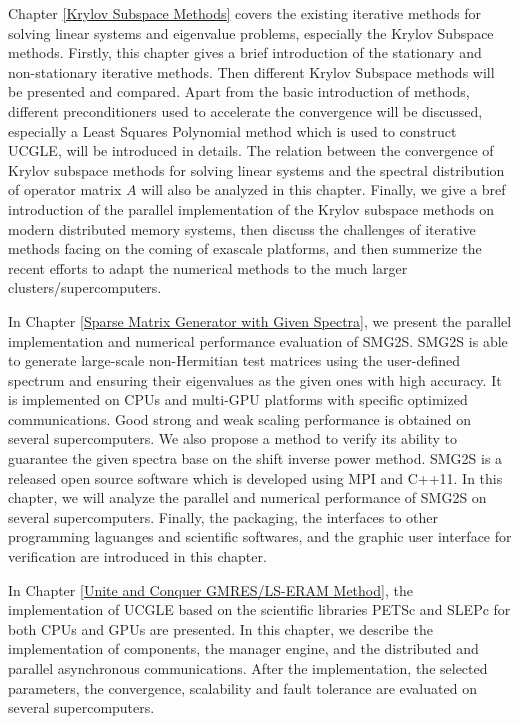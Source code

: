 Chapter \ref{Krylov Subspace Methods} covers the existing iterative methods for solving linear systems and eigenvalue problems, especially the Krylov Subspace methods. Firstly, this chapter gives a brief introduction of the stationary and non-stationary iterative methods. Then different Krylov Subspace methods will be presented and compared. Apart from the basic introduction of methods, different preconditioners used to accelerate the convergence will be discussed, especially a Least Squares Polynomial method which is used to construct UCGLE, will be introduced in details. The relation between the convergence of Krylov subspace methods for solving linear systems and the spectral distribution of operator matrix $A$ will also be analyzed in this chapter. Finally, we give a bref introduction of the parallel implementation of the Krylov subspace methods on modern distributed memory systems, then discuss the challenges of iterative methods facing on the coming of exascale platforms, and then summerize the recent efforts to adapt the numerical methods to the much larger clusters/supercomputers.

In Chapter \ref{Sparse Matrix Generator with Given Spectra}, we present the parallel implementation and numerical performance evaluation of SMG2S.  SMG2S is able to generate large-scale non-Hermitian test matrices using the user-defined spectrum and ensuring their eigenvalues as the given ones with high accuracy. It is implemented on CPUs and multi-GPU platforms with specific optimized communications. Good strong and weak scaling performance is obtained on several supercomputers. We also propose a method to verify its ability to guarantee the given spectra base on the shift inverse power method. SMG2S is a released open source software which is developed using MPI and C++11. In this chapter, we will analyze the parallel and numerical performance of SMG2S on several supercomputers. Finally, the packaging, the interfaces to other programming laguanges and scientific softwares, and the graphic user interface for verification are introduced in this chapter.

In Chapter \ref{Unite and Conquer GMRES/LS-ERAM Method}, the implementation of UCGLE based on the scientific libraries PETSc and SLEPc for both CPUs and GPUs are presented. In this chapter, we describe the implementation of components, the manager engine, and the distributed and parallel asynchronous communications. After the implementation, the selected parameters, the convergence, scalability and fault tolerance are evaluated on several supercomputers.

